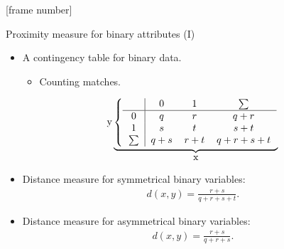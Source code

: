 \documentclass[aspectratio=169,t]{beamer}
\begin{document}
  {
    [frame number]
    \begin{frame}{Proximity measure for binary attributes (I)}
    \begin{itemize}
      \item A contingency table for binary data.
      \begin{itemize}
        \item Counting matches.
      \end{itemize}
      \begin{center}
        \vspace{-0.2cm}
        \[
        \text{y}\underbrace{
        \left\{\begin{tabular}{ c | c c c }
         & $0$ & $1$ & $\sum$ \\ \hline
         $0$ & $q$ & $r$ & $q+r$\\
         $1$ & $s$ & $t$ & $s+t$\\
         $\sum$ & $q+s$ & $r+t$ & $q+r+s+t$
       \end{tabular}\right.}_{\let\scriptstyle\textstyle\substack{\text{x}}}
       \]
      \end{center}
      \item Distance measure for symmetrical binary variables:
      \begin{align}
        d(x,y) = \frac{r+s}{q+r+s+t}.
      \end{align}
      \item Distance measure for asymmetrical binary variables:
      \begin{align}
        d(x,y) = \frac{r+s}{q+r+s}.
      \end{align}
    \end{itemize}
    \end{frame}
  }
\end{document}
